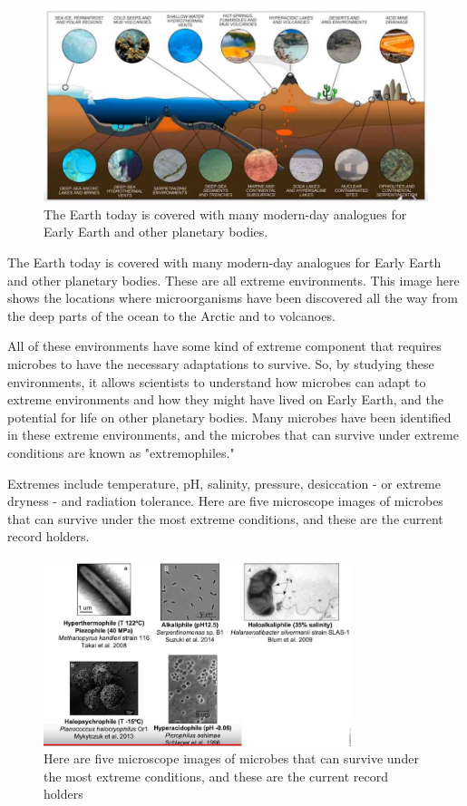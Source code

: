 \documentclass[]{article}
\begin{document}
\begin{figure}[H]
	\caption[A selection of Extreme Environments]{The Earth today is covered
		with many modern-day analogues
		for Early Earth
		and other planetary bodies.}\label{eq:ExtremeEnvironments}
	\includegraphics[width=\textwidth]{ExtremeEnvironments}
\end{figure}
The Earth today is covered
with many modern-day analogues
for Early Earth
and other planetary bodies.
These are all extreme environments.
This image here shows the locations
where microorganisms
have been discovered
all the way from the deep parts
of the ocean
to the Arctic and to volcanoes.

All of these environments
have some kind of extreme component
that requires microbes to have
the necessary adaptations to survive.
So, by studying these environments,
it allows scientists to understand
how microbes can adapt to
extreme environments
and how they might have lived
on Early Earth,
and the potential for life
on other planetary bodies.
Many microbes have been identified
in these extreme environments,
and the microbes that can survive
under extreme conditions
are known as "extremophiles."

Extremes include temperature, pH,
salinity, pressure,
desiccation - or extreme dryness -
and radiation tolerance.
Here are five microscope images
of microbes that can survive
under the most extreme conditions,
and these are the current record holders.

\begin{figure}[H]
      \caption[Five Extremophiles]{Here are five microscope images
      	of microbes that can survive
      	under the most extreme conditions,
      	and these are the current record holders}\label{fig:Extremophiles}
      \includegraphics[width=0.8\textwidth]{Extremophiles}
\end{figure}
\end{document}
